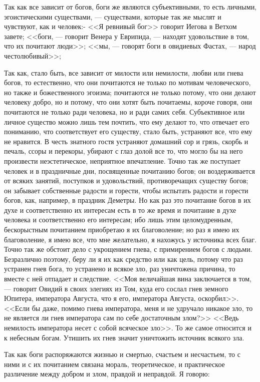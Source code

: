 \documentclass[12pt]{article}
\begin{document}
Так как все зависит от богов, боги же являются субъективными, то есть личными, эгоистическими существами, --- существами, которые так же мыслят и чувствуют, как и человек:- <<Я ревнивый бог>>  говорит Иегова в Ветхом завете; <<боги, --- говорит Венера у Еврипида, --- находят удовольствие в том, что их почитают люди>>; <<мы, --- говорят боги в овидиевых Фастах, --- народ честолюбивый>>; 

Так как, стало быть, все зависит от милости или немилости, любви или гнева богов, то естественно, что они почитаются не только по мотивам человеческого, но также и божественного эгоизма; почитаются не только потому, что они делают человеку добро, но и потому, что они хотят быть почитаемы, короче говоря, они почитаются не только ради человека, но и ради самих себя. Субъективное или личное существо можно лишь тем почтить, что ему делают то, что отвечает его пониманию, что соответствует его существу, стало быть, устраняют все, что ему не нравится. В честь знатного гостя устраняют домашний сор и грязь, скорбь и печаль, ссоры и перекоры, убирают с глаз долой все то, что могло бы на него произвести неэстетическое, неприятное впечатление. Точно так же поступает человек и в праздничные дни, посвященные почитанию богов; он воздерживается от всяких занятий, поступков и удовольствий, противоречащих существу богов; он забывает собственные радости и горести, чтобы испытать радости и горести богов, как, например, в праздник Деметры. Но как раз это почитание богов в их духе и соответственно их интересам есть в то же время и почитание в духе человека и соответственно его интересам; ибо лишь этим целомудренным, бескорыстным почитанием приобретаю я их благоволение; но раз я имею их благоволение, я имею все, что мне желательно, я нахожусь у источника всех благ. Точно так же обстоит дело с укрощением гнева, с примирением богов с людьми. Безразлично поэтому, беру ли я их как средство или как цель, потому что раз устранен гнев бога, то устранено и всякое зло, раз уничтожена причина, то вместе с ней отпадает и следствие. <<Моя величайшая вина заключается в том, --- говорит Овидий в своих элегиях из Том, куда его сослал гнев земного Юпитера, императора Августа, что я его, императора Августа, оскорбил>>. <<Если бы даже, помимо гнева императора, меня и не удручало никакое зло, то не является ли гнев императора сам по себе достаточным злом?>> <<Ведь немилость императора несет с собой всяческое зло>>. То же самое относится и к небесным богам. Утишить их гнев значит уничтожить источник всякого зла. 

Так как боги распоряжаются жизнью и смертью, счастьем и несчастьем, то с ними и с их почитанием связана мораль, теоретическое, и практическое различение между добром и злом, правдой и неправдой. Я говорю: 
\end{document}
